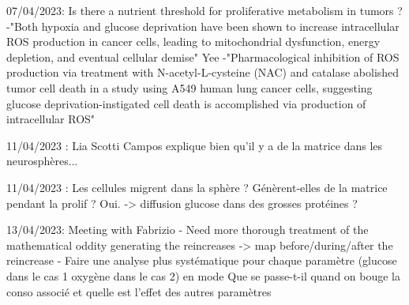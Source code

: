 \documentclass[11pt,a4paper]{article}
\begin{document}
07/04/2023: Is there a nutrient threshold for proliferative metabolism in tumors ?
-"Both hypoxia and glucose deprivation have been shown to increase intracellular ROS production in cancer cells, leading to mitochondrial dysfunction, energy depletion, and eventual cellular demise" Yee
-"Pharmacological inhibition of ROS production via treatment with N-acetyl-L-cysteine (NAC) and catalase abolished tumor cell death in a study using A549 human lung cancer cells, suggesting glucose deprivation-instigated cell death is accomplished via production of intracellular ROS"

11/04/2023 : Lia Scotti Campos explique bien qu'il y a de la matrice dans les neurosphères...

11/04/2023 :  Les cellules migrent dans la sphère ? Génèrent-elles de la matrice pendant la prolif ? Oui. -> diffusion glucose dans des grosses protéines ?

13/04/2023: Meeting with Fabrizio 
- Need more thorough treatment of the mathematical oddity generating the reincreases -> map  before/during/after the reincrease
- Faire une analyse plus systématique pour chaque paramètre (glucose dans le cas 1 oxygène dans le cas 2) en mode Que se passe-t-il quand on bouge la conso associé et quelle est l'effet des autres paramètres
\end{document}
